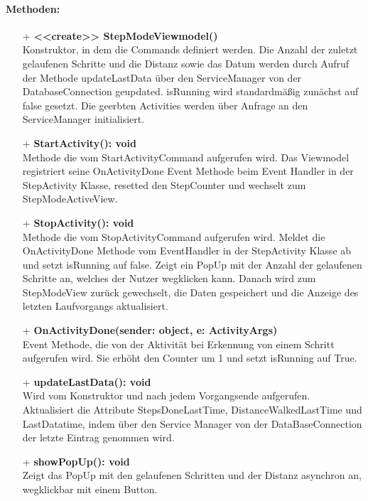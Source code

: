 \documentclass[a4paper,12pt]{article}
\begin{document}
\paragraph{Methoden:}
\begin{itemize}
	\item[+] \textbf{<<create>> StepModeViewmodel()}\\ Konstruktor, in dem die Commands definiert werden. Die Anzahl der zuletzt gelaufenen Schritte und die Distanz sowie das Datum werden durch Aufruf der Methode updateLastData über den ServiceManager von der DatabaseConnection geupdated. isRunning wird standardmäßig zunächst auf false gesetzt. Die geerbten Activities werden über Anfrage an den ServiceManager initialisiert.
	\item[+] \textbf{StartActivity(): void}\\ Methode die vom StartActivityCommand aufgerufen wird. Das Viewmodel registriert seine OnActivityDone Event Methode beim Event Handler in der StepActivity Klasse, resetted den StepCounter und wechselt zum StepModeActiveView. 
	\item[+] \textbf {StopActivity(): void}\\ Methode die vom StopActivityCommand aufgerufen wird. Meldet die OnActivityDone Methode vom EventHandler in der StepActivity Klasse ab und setzt isRunning auf false. Zeigt ein PopUp mit der Anzahl der gelaufenen Schritte an, welches der Nutzer wegklicken kann. Danach wird zum StepModeView zurück gewechselt, die Daten gespeichert und die Anzeige des letzten Laufvorgangs aktualisiert. 
	\item[+] \textbf{OnActivityDone(sender: object, e: ActivityArgs)} \\ Event Methode, die von der Aktivität bei Erkennung von einem Schritt aufgerufen wird. Sie erhöht den Counter um 1 und setzt isRunning auf True. 
	\item[+] \textbf{updateLastData(): void} \\ Wird vom Konstruktor und nach jedem Vorgangsende aufgerufen. Aktualisiert die Attribute StepsDoneLastTime, DistanceWalkedLastTime und LastDatatime, indem über den Service Manager von der DataBaseConnection der letzte Eintrag genommen wird. 
	\item[+] \textbf{showPopUp(): void} \\ Zeigt das PopUp mit den gelaufenen Schritten und der Distanz asynchron an, wegklickbar mit einem Button. 

\end{itemize}
\end{document}
